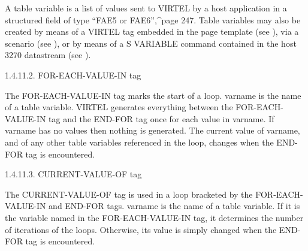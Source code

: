 \documentclass[letterpaper,10pt,english]{sphinxmanual}
\begin{document}
A table variable is a list of values sent to VIRTEL by a host application in a structured field of type “FAE5 or FAE6”,\textasciicircum{}page 247. Table variables may also be created by means of a VIRTEL tag embedded in the page template (see {\hyperref[\detokenize{User_Guide:v457ug-create-variable-from}]{}}), via a scenario (see {\hyperref[\detokenize{User_Guide:v457ug-copy}]{}}), or by means of a S VARIABLE command contained in the host 3270 datastream (see {\hyperref[\detokenize{User_Guide:v457ug-host4web}]{}}).

1.4.11.2. FOR-EACH-VALUE-IN tag

\begin{sphinxVerbatim}[commandchars=\\\{\}]
 
\end{sphinxVerbatim}

The FOR-EACH-VALUE-IN tag marks the start of a loop. varname is the name of a table variable. VIRTEL generates everything between the FOR-EACH-VALUE-IN tag and the END-FOR tag once for each value in varname. If varname has no values then nothing is generated. The current value of varname, and of any other table variables referenced in the loop, changes when the END-FOR tag is encountered.

1.4.11.3. CURRENT-VALUE-OF tag

\begin{sphinxVerbatim}[commandchars=\\\{\}]
 
\end{sphinxVerbatim}

The CURRENT-VALUE-OF tag is used in a loop bracketed by the FOR-EACH-VALUE-IN and END-FOR tags. varname is the name of a table variable. If it is the variable named in the FOR-EACH-VALUE-IN tag, it determines the number of iterations of the loops. Otherwise, its value is simply changed when the END-FOR tag is encountered.
\end{document}
